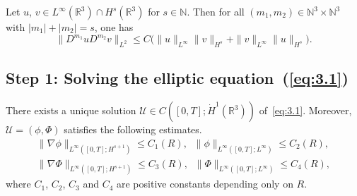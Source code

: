 \documentclass[AHL,Unicode,longabstracts]{cedram}
\newcommand{\R}{\mathbb{R}}
\newcommand{\N}{\mathbb{N}}
\begin{document}
\begin{lemm}\label{alhinac}
Let $u$, $v \in L^\infty(\R^3)\cap H^s(\R^3)$ for $s \in \N$. Then for all $(m_1,m_2)\in \N^3\times \N^3$ with $|m_1|+|m_2|=s$, one has
\[
\| D^{m_1}u D^{m_2}v \|_{L^2}
\leq C\big(\|u \|_{L^\infty} \| v \|_{H^s} +\| v \|_{L^\infty} \| u \|_{H^s}\big).
\]
\end{lemm}

\subsection*{Step 1: Solving the elliptic equation~(\ref{eq:3.1})}

\begin{lemm}\label{elliptic1}
There exists a unique solution $\mathcal{U}\in C([0,T];\dot{H}^1(\R^3))$ of~\eqref{eq:3.1}. Moreover, $\mathcal{U}=(\phi,\Phi)$ satisfies the following estimates.
\begin{align}
\| \nabla\phi \|_{L^\infty([0,T];H^{s+1})} \leq C_1(R), \;\;
\| \phi \|_{L^\infty([0,T];L^\infty)} \leq C_2(R), \label{est1}
\\
\| \nabla\Phi \|_{L^\infty([0,T];H^{s+1})} \leq C_3(R), \;\;
\| \Phi \|_{L^\infty([0,T];L^\infty)} \leq C_4(R), \label{est2}
\end{align}
where $C_1$, $C_2$, $C_3$ and $C_4$ are positive constants depending only on $R$.
\end{lemm}
\end{document}
